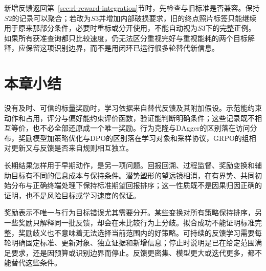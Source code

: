 新增反馈返回第~\ref{sec:rl-reward-integration}节时，先检查与旧标准是否兼容。保持$S2$的记录可以聚合；若改为$S3$并增加内部破损要求，旧的终点照片标签只能继续用于原来那部分条件，必要时重标或分开使用，不能自动视为$S3$下的完整正例。如果所有获准查询都只比较速度，仍无法区分重视完好与重视能耗的两个目标解释，应保留这项识别边界，而不是用闭环已运行很多轮替代新信息。

\section{本章小结}
\label{sec:rl-reward-summary}

没有及时、可信的标量奖励时，学习依据来自替代反馈及其附加假设。示范能约束动作和占用，评分与偏好能约束评价函数，验证能判断明确条件；这些记录既不相互等价，也不必全部还原成一个唯一奖励。行为克隆与DAgger的区别落在访问分布，奖励模型加策略优化与DPO的区别落在学习对象和采样协议，GRPO的组相对更新又与反馈是否来自规则相互独立。

长期结果怎样用于早期动作，是另一项问题。回报回溯、过程监督、奖励变换和辅助目标有不同的信息成本与保持条件。潜势塑形的望远镜相消，在有界势、共同初始分布与正确终端处理下保持标准期望回报排序；这一性质既不是因果归因正确的证明，也不是风险目标或学习速度的保证。

奖励表示不唯一与行为目标错误尤其需要分开。某些变换对所有策略保持排序，另一些奖励只解释同一批反馈，却会在未比较行为上分歧。拟合成功不能证明标准完整，奖励歧义也不意味着无法选择当前范围内的好策略。可持续的反馈学习需要每轮明确固定标准、更新对象、独立证据和新增信息；停止时说明是已在给定范围满足要求，还是因预算或识别边界而停止。反馈更密集、模型更大或迭代更多，都不能替代这些条件。
